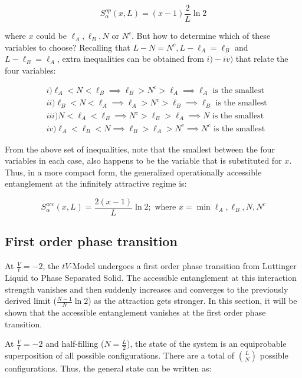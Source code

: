 \begin{equation}
S_\alpha^{op}(x,L) = (x - 1) \frac{2}{L} \ln{2}
\end{equation}

where $x$ could be  $\ell_A, \ell_B, N$ or $N^c$. But how to determine which of these variables to choose? Recalling that $L-N = N^c, L-\ell_A = \ell_B$ and $L-\ell_B = \ell_A$, extra inequalities can be obtained from $i)-iv)$ that relate the four variables:

\begin{align}
& i) \ell_{A} < N < \ell_{B} \implies \ell_{B} > N^c > \ell_{A} \implies \ell_{A} \text{ is the smallest} \nonumber \\
& ii) \ell_{B} < N < \ell_{A} \implies \ell_{A} > N^c > \ell_{B} \implies \ell_{B} \text{ is the smallest} \nonumber \\
& iii)  N < \ell_{A} < \ell_{B} \implies N^c > \ell_{B} > \ell_{A} \implies N \text{ is the smallest} \nonumber \\
& iv) \ell_{A} < \ell_{B} < N \implies \ell_{B} > \ell_{A} > N^c \implies N^c \text{ is the smallest} \nonumber 
\end{align}

From the above set of inequalities, note that the smallest between the four variables in each case, also happens to be the variable that is substituted for $x$. Thus, in a more compact form, the generalized operationally accessible entanglement at the infinitely attractive regime is:

\begin{equation}
S_\alpha^{acc}(x,L) = \frac{2(x-1)}{L} \ln{2} ; \text{ where } x = \min{\ell_A, \ell_B, N, N^c}
\end{equation}

	\subsection{First order phase transition}
	
At $\frac{V}{t} = -2$, the $tV$-Model undergoes a first order phase transition from Luttinger Liquid to Phase Separated Solid. The accessible entanglement at this interaction strength vanishes and then suddenly increases and converges to the previously derived limit ($\frac{N-1}{N}\ln{2}$) as the attraction gets stronger. In this section, it will be shown that the accessible entanglement vanishes at the first order phase transition.

At $\frac{V}{t}=-2$ and half-filling ($N=\frac{L}{2}$), the state of the system is an equiprobable superposition of all possible configurations. There are a total of ${L}\choose{N}$ possible configurations. Thus, the general state can be written as: 


